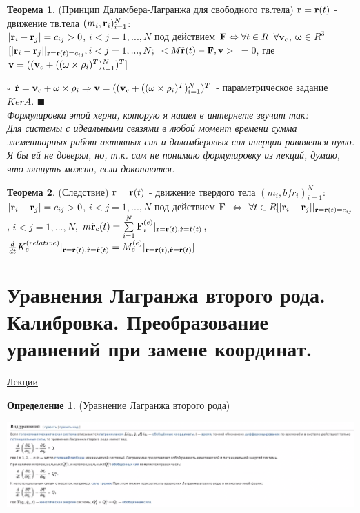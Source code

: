 \documentclass[specialist, subf, href, colorlinks=true, 12pt, times, mtpro, final]{disser}
\theoremstyle{definition}
\newtheorem{defn}{Определение}[section]
\newtheorem{theorem}{Теорема}[section]
\def\note{\textcolor{faded}}
\def\bfomega{\mathbf{\omega}}
\def\bfrho{\mathbf{\rho}}
\begin{document}
    \begin{theorem} (Принцип Даламбера-Лагранжа для свободного тв.тела)
    $\mathbf{r} = \mathbf{r}(t) $ - движение тв.тела $(m_i, \mathbf{r}_i)^N_{i=1}$:\\
    $|\mathbf{r}_i - \mathbf{r}_j| = c_{ij} > 0$, $i < j = 1, ..., N$ под действием 
    $\mathbf{F} \Leftrightarrow \forall t \in R$  $\forall \mathbf{v}_c$, $\bfomega \in R^3$ $[|\mathbf{r}_i - \mathbf{r}_j| |_{ \mathbf{r}=\mathbf{r}(t)=c_{ij}}, i < j = 1,...,N;$  $<M\ddot{\mathbf{r}}(t) - \mathbf{F}, \mathbf{v}>$ $=0$, 
    где $\bfv = ((\bfv_c + ((\bfomega\times\bfrho_i)^T)^N_{i=1})^T]$
    \end{theorem}    
    
    $\square$
    $\dot{\bfr} = \bfv_c + \bfomega\times\bfrho_i \Rightarrow \bfv = ((\bfv_c + ((\bfomega\times\bfrho_i)^T)^N_{i=1})^T$ - параметрическое задание $KerA$. $\blacksquare$\\
    
    \note{\it Формулировка этой херни, которую я нашел в интернете звучит так:\\ Для системы с идеальными связями в любой момент времени сумма элементарных работ активных сил и даламберовых сил инерции равняется нулю. \\Я бы ей не доверял, но, т.к. сам не понимаю формулировку из лекций, думаю, что ляпнуть можно, если докопаются.}
    
     \begin{theorem} (\hyperlink {first_lects.28}{Следствие})
    $\mathbf{r} = \mathbf{r}(t)$ - движение твердого тела 
    $(m_i, bfr_i)^N_{i=1}$: $|\mathbf{r}_i - \mathbf{r}_j| = c_{ij} > 0$, $i<j = 1,...,N$ 
    под действием $\mathbf{F}$ $\Leftrightarrow$ $\forall t \in R [|\mathbf{r}_i - \mathbf{r}_j| |_{\mathbf{r}=\mathbf{r}(t)=c_{ij}}$,
     $i<j=1,...,N$, $m\ddot{\mathbf{r}}_c(t)=\sum\limits^N_{i=1} \mathbf{F}^{(e)}_i |_{\mathbf{r}=\mathbf{r}(t), \dot{\mathbf{r}}=\dot{\mathbf{r}}(t)}$,
      $\frac{d}{dt}K^{(relative)}_c|_{\mathbf{r}=\mathbf{r}(t), \dot{\mathbf{r}}=\dot{\mathbf{r}}(t)} = M^{(e)}_c |_{\mathbf{r}=\mathbf{r}(t), \dot{\mathbf{r}}=\dot{\mathbf{r}}(t)}]$
      \end{theorem}
     
    
    \section{Уравнения Лагранжа второго рода. Калибровка. Преобразование уравнений при замене координат.}
     \label{7}
    \hyperlink {first_lects.29}{Лекции} \\
    \begin{defn}(Уравнение Лагранжа второго рода)
		\begin{center}
 			\includegraphics[scale=0.5]{pics/lagranzh}
		\end{center}
	\end{defn}
	
\end{document}
